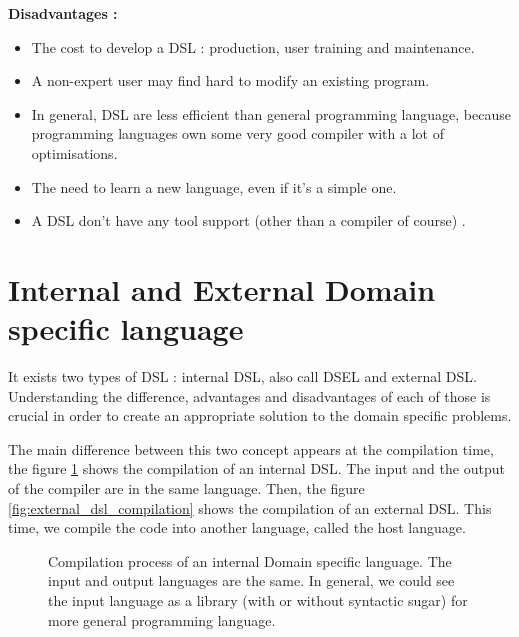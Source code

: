 \textbf{Disadvantages \cite{VanDeursen2000}:}
\begin{itemize}
\item The cost to develop a DSL : production, user training and
  maintenance.
\item A non-expert user may find hard to modify an existing program.
\item In general, DSL are less efficient than general programming language,
  because programming languages own some very good compiler with a lot of
  optimisations.
\item The need to learn a new language, even if it's a simple one.
\item A DSL don't have any tool support (other than a compiler of course) \cite{Mernik2005}.
\end{itemize}

\section{Internal and External Domain specific language}
\label{sec:internal_and_external_dsl}

It exists two types of \gls{DSL} : internal \gls{DSL}, also call \gls{DSEL} and
external DSL. Understanding the difference, advantages and disadvantages of each
of those is crucial in order to create an appropriate solution to the domain
specific problems.

The main difference between this two concept appears at the compilation time,
the figure \ref{fig:internal_dsl_compilation} shows the compilation of an
internal DSL. The input and the output of the compiler are in the same language.
Then, the figure \ref{fig:external_dsl_compilation} shows the compilation of an
external DSL. This time, we compile the code into another language, called the host language.

\begin{figure}[ht]
  \centering
  \caption[Compilation process of an internal \gls{DSL}]{Compilation process of
    an internal Domain specific language. The input and output languages are the
    same. In general, we could see the input language as a library (with or
    without syntactic sugar) for more general programming language.}
  \label{fig:internal_dsl_compilation}
\end{figure}

